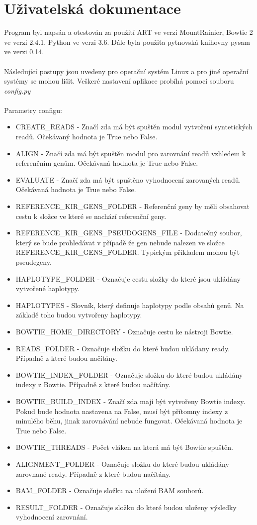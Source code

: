 \documentclass[czech,DP]{thesiskiv}
\numberwithin{equation}{section}
\begin{document}
\chapter{Uživatelská dokumentace}
Program byl napsán a otestován za použití ART ve verzi MountRainier, Bowtie 2 ve verzi 2.4.1, Python ve verzi 3.6. Dále byla použita pytnovská knihovny pysam ve verzi 0.14. 
\\
\\
Následující postupy jsou uvedeny pro operační systém Linux a pro jiné operační systémy se mohou lišit. Veškeré nastavení aplikace probíhá pomocí souboru \textit{config.py}
\\
\\
\noindent
Parametry configu:
\begin{itemize}
	\item CREATE\_READS - Značí zda má být spuštěn modul vytvoření syntetických readů. Očekávaný hodnota je True nebo False.
	\item ALIGN - Značí zda má být spuštěn modul pro zarovnání readů vzhledem k referenčním genům. Očekávaná hodnota je True nebo False.
	\item EVALUATE - Značí zda má být spuštěno vyhodnocení zarovaných readů. Očekávaná hodnota je True nebo False.
	\item REFERENCE\_KIR\_GENS\_FOLDER - Referenční geny by měli obsahovat cestu k složce ve které se nachází referenční geny.
	\item REFERENCE\_KIR\_GENS\_PSEUDOGENS\_FILE - Dodatečný soubor, který se bude prohledávat v případě že gen nebude nalezen ve složce REFERENCE\_KIR\_GENS\_FOLDER. Typickým příkladem mohou být pseudegeny. 
	\item HAPLOTYPE\_FOLDER - Označuje cestu složky do které jsou ukládány vytvořené haplotypy. 
	\item HAPLOTYPES - Slovník, který definuje haplotypy podle obsahů genů. Na základě toho budou vytvořeny haplotypy.
	\item BOWTIE\_HOME\_DIRECTORY - Označuje cestu ke nástroji Bowtie.
	\item READS\_FOLDER - Označuje složku do které budou ukládany ready. Případně z které budou načítány.
	\item BOWTIE\_INDEX\_FOLDER - Označuje složku do které budou ukládány indexy z Bowtie. Případně z které budou načítány. 
	\item BOWTIE\_BUILD\_INDEX - Značí zda mají být vytvořeny Bowtie indexy. Pokud bude hodnota nastavena na False, musí být přítomny indexy z minulého běhu, jinak zarovnávání nebude fungovat. Očekávaná hodnota je True nebo False.
	\item BOWTIE\_THREADS - Počet vláken na která má být Bowtie spuštěn.	
	\item ALIGNMENT\_FOLDER - Označuje složku do které budou ukládány zarovnané ready. Případně z které budou načítány. 
	\item BAM\_FOLDER - Označuje složku na uložení BAM souborů.  
	\item RESULT\_FOLDER - Označuje složku do které budou uloženy výsledky vyhodnocení zarovnání.
\end{itemize}
\end{document}
